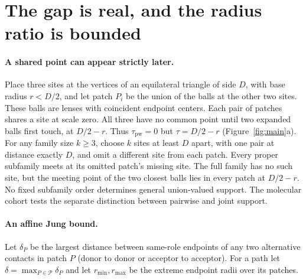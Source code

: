 \documentclass[11pt]{article}
\newcommand{\pw}{\tau_{\mathrm{pw}}}
\begin{document}
\section{The gap is real, and the radius ratio is bounded}
\label{sec:bound}

\paragraph{A shared point can appear strictly later.}
Place three sites at the vertices of an equilateral triangle of side $D$, with base radius $r<D/2$, and let patch $P_i$ be the union of the balls at the other two sites. These balls are lenses with coincident endpoint centers. Each pair of patches shares a site at scale zero. All three have no common point until two expanded balls first touch, at $D/2-r$. Thus $\pw=0$ but $\tau=D/2-r$ (Figure~\ref{fig:main}a). For any family size $k\geq 3$, choose $k$ sites at least $D$ apart, with one pair at distance exactly $D$, and omit a different site from each patch. Every proper subfamily meets at its omitted patch's missing site. The full family has no such site, but the meeting point of the two closest balls lies in every patch at $D/2-r$. No fixed subfamily order determines general union-valued support. The molecular cohort tests the separate distinction between pairwise and joint support.

\paragraph{An affine Jung bound.}
Let $\delta_P$ be the largest distance between same-role endpoints of any two alternative contacts in patch $P$ (donor to donor or acceptor to acceptor). For a path let $\delta=\max_{P\in\mathcal P}\delta_P$ and let $r_{\min},r_{\max}$ be the extreme endpoint radii over its patches.
\end{document}
